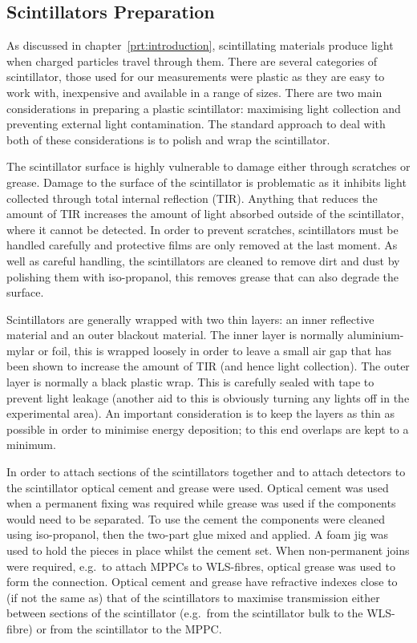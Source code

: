 \subsection{Scintillators Preparation} %
\label{sub:scintillator_preparation}
As discussed in chapter~\ref{prt:introduction}, scintillating materials produce light when charged particles travel through them. There are several categories of scintillator, those used for our measurements were plastic as they are easy to work with, inexpensive and available in a range of sizes. There are two main considerations in preparing a plastic scintillator: maximising light collection and preventing external light contamination. The standard approach to deal with both of these considerations is to polish and wrap the scintillator.

The scintillator surface is highly vulnerable to damage either through scratches or grease. Damage to the surface of the scintillator is problematic as it inhibits light collected through total internal reflection (TIR). Anything that reduces the amount of TIR increases the amount of light absorbed outside of the scintillator, where it cannot be detected. In order to prevent scratches, scintillators must be handled carefully and protective films are only removed at the last moment. As well as careful handling, the scintillators are cleaned to remove dirt and dust by polishing them with iso-propanol, this removes grease that can also degrade the surface.

Scintillators are generally wrapped with two thin layers: an inner reflective material and an outer blackout material. The inner layer is normally aluminium-mylar or foil, this is wrapped loosely in order to leave a small air gap that has been shown to increase the amount of TIR (and hence light collection). The outer layer is normally a black plastic wrap. This is carefully sealed with tape to prevent light leakage (another aid to this is obviously turning any lights off in the experimental area). An important consideration is to keep the layers as thin as possible in order to minimise energy deposition; to this end overlaps are kept to a minimum.

In order to attach sections of the scintillators together and to attach detectors to the scintillator optical cement and grease were used. Optical cement was used when a permanent fixing was required while grease was used if the components would need to be separated. To use the cement the components were cleaned using iso-propanol, then the two-part glue mixed and applied. A foam jig was used to hold the pieces in place whilst the cement set. When non-permanent joins were required, e.g.\ to attach MPPCs to WLS-fibres, optical grease was used to form the connection. Optical cement and grease have refractive indexes close to (if not the same as) that of the scintillators to maximise transmission either between sections of the scintillator (e.g.\ from the scintillator bulk to the WLS-fibre) or from the scintillator to the MPPC.

